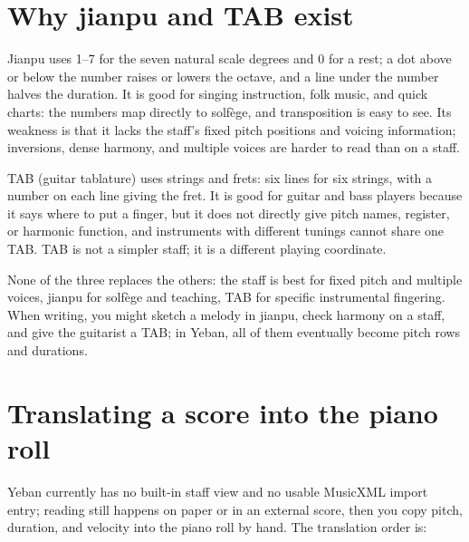 \section{Why jianpu and TAB exist}

Jianpu uses 1--7 for the seven natural scale degrees and 0 for a rest; a dot above or below the number raises or lowers the octave, and a line under the number halves the duration. It is good for singing instruction, folk music, and quick charts: the numbers map directly to solfège, and transposition is easy to see. Its weakness is that it lacks the staff's fixed pitch positions and voicing information; inversions, dense harmony, and multiple voices are harder to read than on a staff.

TAB (guitar tablature) uses strings and frets: six lines for six strings, with a number on each line giving the fret. It is good for guitar and bass players because it says where to put a finger, but it does not directly give pitch names, register, or harmonic function, and instruments with different tunings cannot share one TAB. TAB is not a simpler staff; it is a different playing coordinate.

None of the three replaces the others: the staff is best for fixed pitch and multiple voices, jianpu for solfège and teaching, TAB for specific instrumental fingering. When writing, you might sketch a melody in jianpu, check harmony on a staff, and give the guitarist a TAB; in Yeban, all of them eventually become pitch rows and durations.

\section{Translating a score into the piano roll}

Yeban currently has no built-in staff view and no usable MusicXML import entry; reading still happens on paper or in an external score, then you copy pitch, duration, and velocity into the piano roll by hand. The translation order is:

